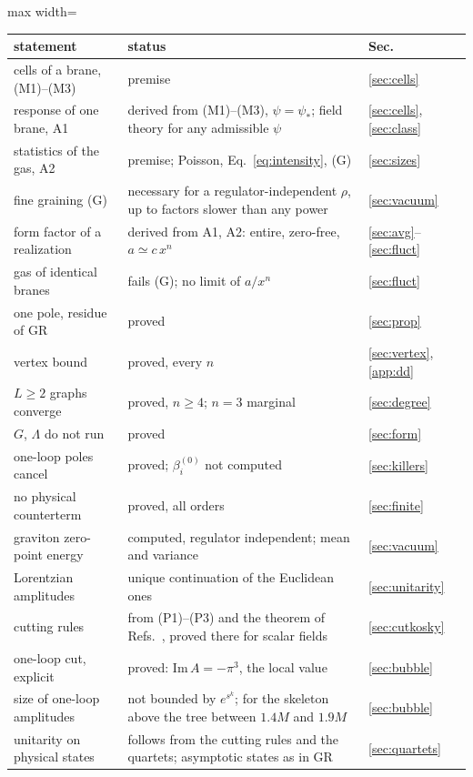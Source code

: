 \documentclass[a4paper,11pt]{article}
\begin{document}
\begin{table}[tp]
\centering
\small\begin{adjustbox}{max width=\linewidth}\begin{tabular}{p{4.6cm}p{9.9cm}p{2.0cm}}
statement & status & Sec.\\
\hline
cells of a brane, (M1)--(M3) & premise & \ref{sec:cells}\\
response of one brane, A1 & derived from (M1)--(M3), $\psi=\psi_*$; field theory for any admissible $\psi$ & \ref{sec:cells}, \ref{sec:class}\\
statistics of the gas, A2 & premise; Poisson, Eq.~\eqref{eq:intensity}, (G) & \ref{sec:sizes}\\
fine graining (G) & necessary for a regulator-independent $\rho$, up to factors slower than any power & \ref{sec:vacuum}\\
form factor of a realization & derived from A1, A2: entire, zero-free, $a\simeq c\,x^n$ & \ref{sec:avg}--\ref{sec:fluct}\\
gas of identical branes & fails (G); no limit of $a/x^n$ & \ref{sec:fluct}\\
one pole, residue of GR & proved & \ref{sec:prop}\\
vertex bound & proved, every $n$ & \ref{sec:vertex}, \ref{app:dd}\\
$L\ge2$ graphs converge & proved, $n\ge4$; $n=3$ marginal & \ref{sec:degree}\\
$G$, $\Lambda$ do not run & proved & \ref{sec:form}\\
one-loop poles cancel & proved; $\beta^{(0)}_i$ not computed & \ref{sec:killers}\\
no physical counterterm & proved, all orders & \ref{sec:finite}\\
graviton zero-point energy & computed, regulator independent; mean and variance & \ref{sec:vacuum}\\
Lorentzian amplitudes & unique continuation of the Euclidean ones & \ref{sec:unitarity}\\
cutting rules & from (P1)--(P3) and the theorem of Refs.~\cite{PiusSen2016,BrisceseModesto2019}, proved there for scalar fields & \ref{sec:cutkosky}\\
one-loop cut, explicit & proved: $\mathrm{Im}\,A=-\pi^3$, the local value & \ref{sec:bubble}\\
size of one-loop amplitudes & not bounded by $e^{s^k}$; for the skeleton above the tree between $1.4M$ and $1.9M$ & \ref{sec:bubble}\\
unitarity on physical states & follows from the cutting rules and the quartets; asymptotic states as in GR & \ref{sec:quartets}\\

\end{tabular}
\end{adjustbox}
\end{table}
\end{document}

